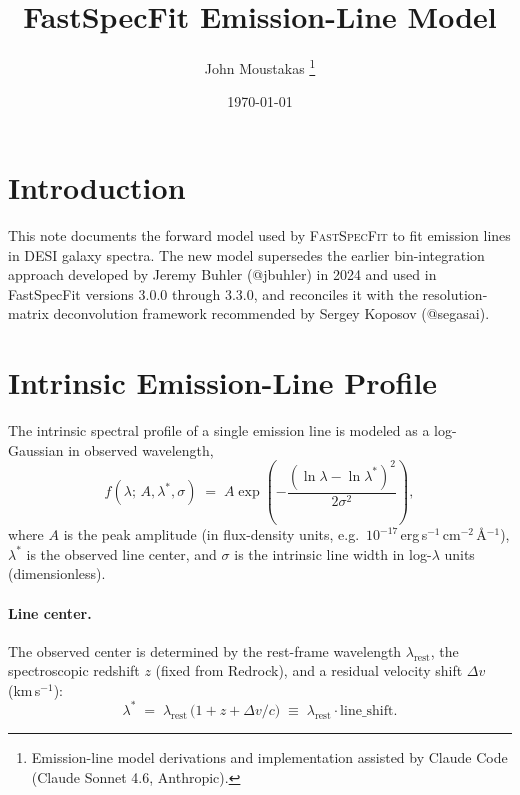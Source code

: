 \documentclass[12pt]{article}
\title{FastSpecFit Emission-Line Model}
\author{John Moustakas%
  \thanks{Emission-line model derivations and implementation assisted by
    Claude Code (Claude Sonnet 4.6, Anthropic).}}
\date{\today}
\newcommand{\lstar}{\lambda^{*}}
\newcommand{\C}{c}                             %
\begin{document}
\maketitle

\section{Introduction}

This note documents the forward model used by \textsc{FastSpecFit} to
fit emission lines in DESI galaxy spectra. The new model supersedes
the earlier bin-integration approach developed by Jeremy Buhler
(@jbuhler) in 2024 and used in FastSpecFit versions 3.0.0 through
3.3.0, and reconciles it with the resolution-matrix deconvolution
framework recommended by Sergey Koposov (@segasai).



\section{Intrinsic Emission-Line Profile}
\label{sec:intrinsic}

The intrinsic spectral profile of a single emission line is modeled as a
log-Gaussian in observed wavelength,
\begin{equation}
  f(\lambda;\, A,\lstar,\sigma)
  \;=\;
  A \exp\!\left(-\frac{(\ln\lambda - \ln\lstar)^{2}}{2\sigma^{2}}\right),
  \label{eq:intrinsic}
\end{equation}
where $A$ is the peak amplitude (in flux-density units, e.g.\
$10^{-17}$\,erg\,s$^{-1}$\,cm$^{-2}$\,\AA$^{-1}$), $\lstar$ is the
observed line center, and $\sigma$ is the intrinsic line width in
log-$\lambda$ units (dimensionless).

\paragraph{Line center.}
The observed center is determined by the rest-frame wavelength
$\lambda_{\mathrm{rest}}$, the spectroscopic redshift $z$ (fixed from
Redrock), and a residual velocity shift $\Delta v$ (km\,s$^{-1}$):
\begin{equation}
  \lstar \;=\; \lambda_{\mathrm{rest}}\,\bigl(1 + z + \Delta v/\C\bigr)
  \;\equiv\; \lambda_{\mathrm{rest}} \cdot \text{line\_shift}.
  \label{eq:lstar}
\end{equation}
\end{document}
